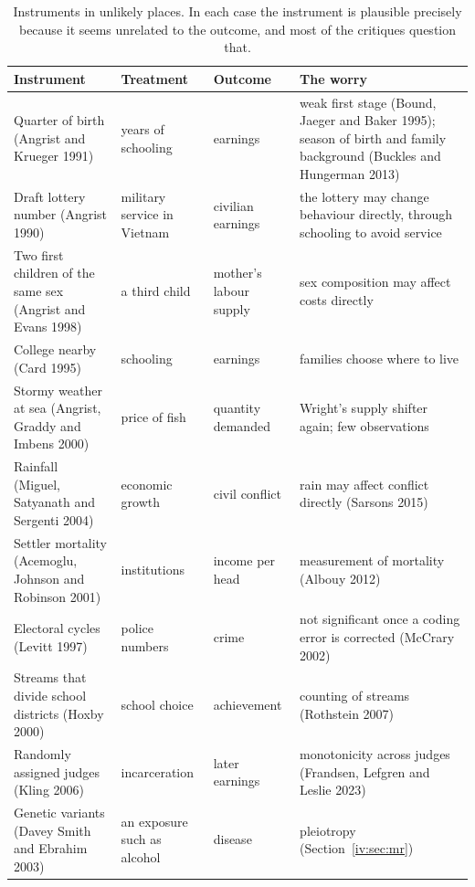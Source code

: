 \begin{table}[htbp]
\centering\scriptsize
\renewcommand{\arraystretch}{1.1}
\begin{tabular}{@{}L{1.0in}L{0.9in}L{0.95in}L{1.15in}@{}}
\toprule
Instrument & Treatment & Outcome & The worry \\
\midrule
Quarter of birth (Angrist and Krueger 1991) & years of schooling & earnings & weak first stage (Bound, Jaeger and Baker 1995); season of birth and family background (Buckles and Hungerman 2013) \\
Draft lottery number (Angrist 1990) & military service in Vietnam & civilian earnings & the lottery may change behaviour directly, through schooling to avoid service \\
Two first children of the same sex (Angrist and Evans 1998) & a third child & mother's labour supply & sex composition may affect costs directly \\
College nearby (Card 1995) & schooling & earnings & families choose where to live \\
Stormy weather at sea (Angrist, Graddy and Imbens 2000) & price of fish & quantity demanded & Wright's supply shifter again; few observations \\
Rainfall (Miguel, Satyanath and Sergenti 2004) & economic growth & civil conflict & rain may affect conflict directly (Sarsons 2015) \\
Settler mortality (Acemoglu, Johnson and Robinson 2001) & institutions & income per head & measurement of mortality (Albouy 2012) \\
Electoral cycles (Levitt 1997) & police numbers & crime & not significant once a coding error is corrected (McCrary 2002) \\
Streams that divide school districts (Hoxby 2000) & school choice & achievement & counting of streams (Rothstein 2007) \\
Randomly assigned judges (Kling 2006) & incarceration & later earnings & monotonicity across judges (Frandsen, Lefgren and Leslie 2023) \\
Genetic variants (Davey Smith and Ebrahim 2003) & an exposure such as alcohol & disease & pleiotropy (Section~\ref{iv:sec:mr}) \\
\bottomrule
\end{tabular}
\caption{Instruments in unlikely places. In each case the instrument is plausible precisely because it seems unrelated to the outcome, and most of the critiques question that.}
\label{tab:unlikely}
\end{table}




